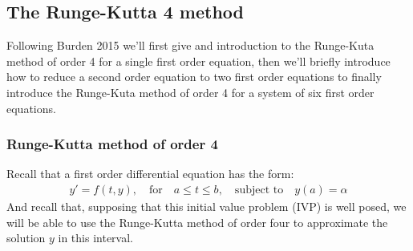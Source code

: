 \documentclass[12pt,twoside]{extarticle}
\begin{document}
\subsection{The Runge-Kutta 4 method}
%
%
%
%

Following  Burden 2015 \cite{burden2015numerical} we'll first give and introduction to the Runge-Kuta method of order 4 for a single first order equation, then we'll briefly introduce how to reduce a second order equation to two first order equations to finally introduce the Runge-Kuta method of order 4 for a system of six first order equations.

\subsubsection{Runge-Kutta method of order 4}
    Recall that a first order differential equation has the form:
    \begin{align*}
        y'=f(t,y), \quad \text{for} \quad a \leq t \leq b, \quad \text{subject to} \quad y(a)=\alpha
    \end{align*}
    And recall that,
    supposing that this initial value problem (IVP) is well posed, we will be able to use the Runge-Kutta method of order four to approximate the solution $y$ in this interval.
    
\end{document}
